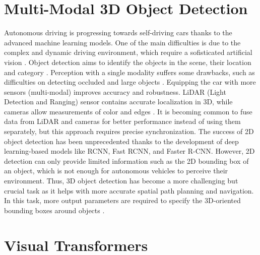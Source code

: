 \section{Multi-Modal 3D Object Detection}
Autonomous driving is progressing towards self-driving cars thanks to the advanced machine learning models. One of the main difficulties is due to the complex and dynamic driving environment, which require a sofisticated artificial vision \cite{wang2021multi}. Object detection aims to identify the objects in the scene, their location and category \cite{wang2021multi}. Perception with a single modality suffers some drawbacks, such as difficulties on detecting occluded and large objects \cite{huang2022multi}\cite{caesar2020nuscenes}. Equipping the car with more sensors (multi-modal) improves accuracy and robustness. LiDAR (Light Detection and Ranging) sensor contains accurate localization in 3D, while cameras allow measurements of color and edges \cite{caesar2020nuscenes}. It is becoming common to fuse data from LiDAR and cameras for better performance instead of using them separately, but this approach requires precise synchronization.
The success of 2D object detection has been unprecedented thanks to the development of deep learning-based models like RCNN, Fast RCNN, and Faster R-CNN. However, 2D detection can only provide limited information such as the 2D bounding box of an object, which is not enough for autonomous vehicles to perceive their environment. Thus, 3D object detection has become a more challenging but crucial task as it helps with more accurate spatial path planning and navigation. In this task, more output parameters are required to specify the 3D-oriented bounding boxes around objects \cite{wang2021multi}.



\section{Visual Transformers}
